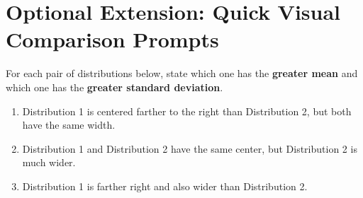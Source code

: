 \documentclass[11pt]{article}
\newcommand{\biganswer}{\vspace{2cm}}
\begin{document}
\section{Optional Extension: Quick Visual Comparison Prompts}

For each pair of distributions below, state which one has the \textbf{greater mean} and which one has the \textbf{greater standard deviation}.

\begin{enumerate}[leftmargin=*, label=\textbf{\Alph*.}]
    \item Distribution 1 is centered farther to the right than Distribution 2, but both have the same width.
    \biganswer
    \item Distribution 1 and Distribution 2 have the same center, but Distribution 2 is much wider.
    \biganswer
    \item Distribution 1 is farther right and also wider than Distribution 2.
    \biganswer
\end{enumerate}
\end{document}

